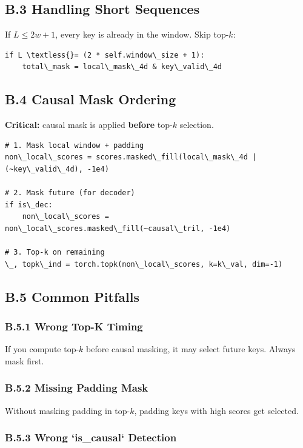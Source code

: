 \subsection{B.3 Handling Short Sequences}

If $L \leq 2w + 1$, every key is already in the window. Skip top-$k$:

\begin{lstlisting}
if L \textless{}= (2 * self.window\_size + 1):
    total\_mask = local\_mask\_4d & key\_valid\_4d
\end{lstlisting}

\subsection{B.4 Causal Mask Ordering}

\textbf{Critical:} causal mask is applied \textbf{before} top-$k$ selection.

\begin{lstlisting}
# 1. Mask local window + padding
non\_local\_scores = scores.masked\_fill(local\_mask\_4d | (~key\_valid\_4d), -1e4)

# 2. Mask future (for decoder)
if is\_dec:
    non\_local\_scores = non\_local\_scores.masked\_fill(~causal\_tril, -1e4)

# 3. Top-k on remaining
\_, topk\_ind = torch.topk(non\_local\_scores, k=k\_val, dim=-1)
\end{lstlisting}

\subsection{B.5 Common Pitfalls}

\subsubsection{B.5.1 Wrong Top-K Timing}

If you compute top-$k$ before causal masking, it may select future keys. 
Always mask first.

\subsubsection{B.5.2 Missing Padding Mask}

Without masking padding in top-$k$, padding keys with high scores get 
selected.

\subsubsection{B.5.3 Wrong `is\_causal` Detection}

